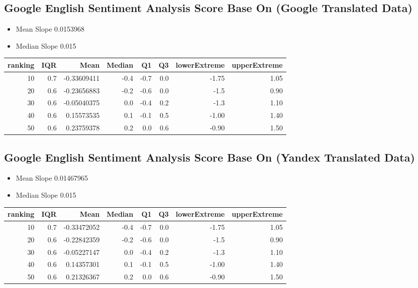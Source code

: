 \documentclass[conference,compsoc]{IEEEtran}
\begin{document}
\subsection{Google English Sentiment Analysis Score Base On (Google Translated Data)}
\begin{itemize}
\item Mean Slope
  0.0153968
\end{itemize}
\begin{itemize}
\item Median Slope
  0.015
\end{itemize}


\begin{center}
\begin{tabular}{rrrrrrrr}
ranking & IQR & Mean & Median & Q1 & Q3 & lowerExtreme & upperExtreme\\
\hline
10 & 0.7 & -0.33609411 & -0.4 & -0.7 & 0.0 & -1.75 & 1.05\\
20 & 0.6 & -0.23656883 & -0.2 & -0.6 & 0.0 & -1.5 & 0.90\\
30 & 0.6 & -0.05040375 & 0.0 & -0.4 & 0.2 & -1.3 & 1.10\\
40 & 0.6 & 0.15573535 & 0.1 & -0.1 & 0.5 & -1.00 & 1.40\\
50 & 0.6 & 0.23759378 & 0.2 & 0.0 & 0.6 & -0.90 & 1.50\\
\end{tabular}
\end{center}

\subsection{Google English Sentiment Analysis Score Base On (Yandex Translated Data)}
\begin{itemize}
\item Mean Slope
  0.01467965
\end{itemize}
\begin{itemize}
\item Median Slope
  0.015
\end{itemize}


\begin{center}
\begin{tabular}{rrrrrrrr}
ranking & IQR & Mean & Median & Q1 & Q3 & lowerExtreme & upperExtreme\\
\hline
10 & 0.7 & -0.33472052 & -0.4 & -0.7 & 0.0 & -1.75 & 1.05 \\
20 & 0.6 & -0.22842359 & -0.2 & -0.6 & 0.0 & -1.5 & 0.90 \\
30 & 0.6 & -0.05227147 & 0.0 & -0.4 & 0.2 & -1.3 & 1.10\\
40 & 0.6 & 0.14357301 & 0.1 & -0.1 & 0.5 & -1.00 & 1.40\\
50 & 0.6 & 0.21326367 & 0.2 & 0.0 & 0.6 &-0.90 & 1.50\\
\end{tabular}
\end{center}
\end{document}
